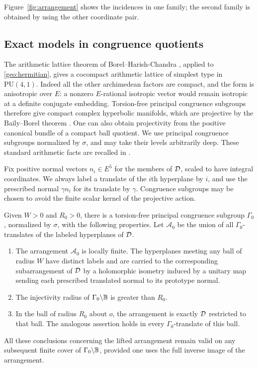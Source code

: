 Figure~\ref{fig:arrangement} shows the incidences in one family; the
second family is obtained by using the other coordinate pair.


\subsection{Exact models in congruence quotients}\label{geo:separation}

The arithmetic lattice theorem of Borel--Harish-Chandra
\cite[Corollary~12.4]{BorelHarishChandra1962}, applied to
\eqref{geo:hermitian}, gives a
cocompact arithmetic lattice of simplest type in $\mathrm{PU}(4,1)$.
Indeed all the other archimedean factors are compact, and the form is
anisotropic over $E$: a nonzero $E$-rational isotropic vector would
remain isotropic at a definite conjugate embedding.  Torsion-free
principal congruence subgroups therefore give compact complex
hyperbolic manifolds, which are projective by the Baily--Borel theorem
\cite[Theorem~10.11]{BailyBorel1966}.  One can
also obtain projectivity from the positive canonical bundle of a
compact ball quotient.  We use principal congruence subgroups normalized
by $\sigma$, and may take their levels arbitrarily deep.  These standard
arithmetic facts are recalled in \cite[Section~3.1]{StoverToledo}.

Fix positive normal vectors $n_i\in E^5$ for the members of $\mathcal D$,
scaled to have integral coordinates.  We always label a translate of
the $i$th hyperplane by $i$, and use the prescribed normal $\gamma n_i$
for its translate by $\gamma$.  Congruence subgroups may be chosen to
avoid the finite scalar kernel of the projective action.

\begin{proposition}\label{prop:arrangement-local}
Given $W>0$ and $R_0>0$, there is a torsion-free principal congruence
subgroup $\Gamma_0$, normalized by $\sigma$, with the following
properties.  Let $\mathcal A_0$ be the union of all $\Gamma_0$-translates
of the labeled hyperplanes of $\mathcal D$.
\begin{enumerate}
\item The arrangement $\mathcal A_0$ is locally finite.  The hyperplanes
meeting any ball of radius $W$ have distinct labels and are carried to
the corresponding subarrangement of $\mathcal D$ by a holomorphic isometry
induced by a unitary map sending each prescribed translated normal to
its prototype normal.
\item The injectivity radius of $\Gamma_0\backslash\mathbb B$ is greater than
$R_0$.
\item In the ball of radius $R_0$ about $o$, the arrangement is exactly
$\mathcal D$ restricted to that ball.  The analogous assertion holds in every
$\Gamma_0$-translate of this ball.
\end{enumerate}
All these conclusions concerning the lifted arrangement remain valid
on any subsequent finite cover of $\Gamma_0\backslash\mathbb B$, provided one
uses the full inverse image of the arrangement.
\end{proposition}


